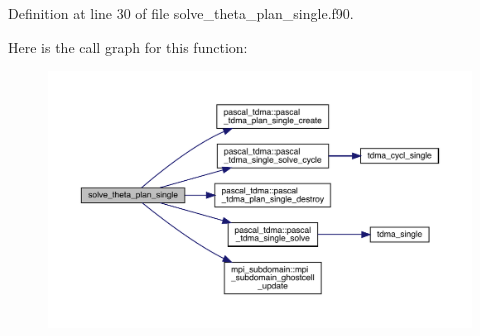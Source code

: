 Definition at line 30 of file solve\+\_\+theta\+\_\+plan\+\_\+single.\+f90.

Here is the call graph for this function\+:
\nopagebreak
\begin{figure}[H]
\begin{center}
\leavevmode
\includegraphics[width=350pt]{solve__theta__plan__single_8f90_a53ef6756822306f33a47be6a66232862_cgraph}
\end{center}
\end{figure}
